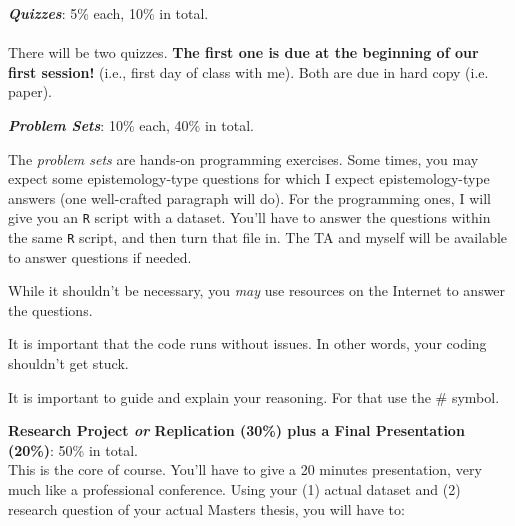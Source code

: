 \documentclass[letterpaper]{article}
\renewenvironment{itemize}{
  \begin{list}{}{
    \setlength{\leftmargin}{1.5em}
  }
}{
  \end{list}
}
\begin{document}
\begin{enumerate}

	\item {\bf \emph{Quizzes}}: 5\% each, 10\% in total.
	\\
  \\
   There will be two quizzes. {\bf The first one is due at the beginning of our first session!} (i.e., first day of class with me). Both are due in hard copy (i.e. paper). 

	\item {\bf \emph{Problem Sets}}: 10\% each, 40\% in total.

The \emph{problem sets} are hands-on programming exercises. Some times, you may expect some epistemology-type questions for which I expect epistemology-type answers (one well-crafted paragraph will do). For the programming ones, I will give you an \texttt{R} script with a dataset. You'll have to answer the questions within the same \texttt{R} script, and then turn that file in. The TA and myself will be available to answer questions if needed. 

\begin{itemize}
		\item[$\diamond$] While it shouldn't be necessary, you \emph{may} use resources on the Internet to answer the questions.
		\item[$\diamond$] It is important that the code runs without issues. In other words, your coding shouldn't get stuck.
		\item[$\diamond$] It is important to guide and explain your reasoning. For that use the \# symbol.
\end{itemize}


\item {\bf Research Project \emph{or} Replication (30\%) plus a Final Presentation (20\%)}: 50\% in total.\\

This is the core of course. You'll have to give a 20 minutes presentation, very much like a professional conference. Using your (1) actual dataset and (2) research question of your actual Masters thesis, you will have to:

\begin{itemize}


\end{itemize}
\end{enumerate}
\end{document}
